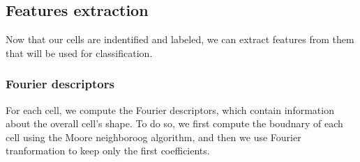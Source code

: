\documentclass[a4paper]{article}
\begin{document}
\subsection{Features extraction}

Now that our cells are indentified and labeled, we can extract features from them that will be used for classification.

\subsubsection{Fourier descriptors}

For each cell, we compute the Fourier descriptors, which contain information about the overall cell's shape.
To do so, we first compute the boudnary of each cell using the Moore neighboroog algorithm, and then we use Fourier tranformation to keep only the first coefficients.
\end{document}
